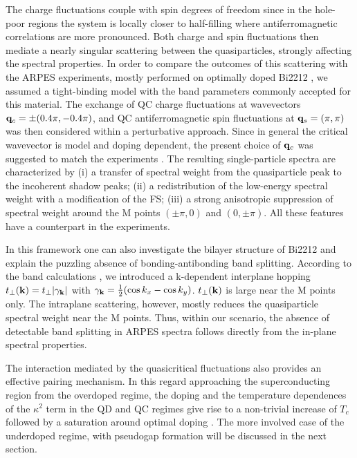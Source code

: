 \documentclass[twoside]{article}
\begin{document}
The charge fluctuations couple with spin degrees of freedom since in the 
hole-poor regions the system is locally closer to half-filling where
antiferromagnetic correlations are more pronounced.  Both charge and spin 
fluctuations then mediate a nearly singular scattering between the
quasiparticles, strongly affecting the spectral properties. In order to 
compare the outcomes of this scattering with the ARPES experiments, mostly 
performed on optimally doped Bi2212 \cite{SAINI}, we assumed \cite{CAPRARA} a 
tight-binding model with the band parameters commonly accepted for this 
material. 
The exchange of QC charge fluctuations at wavevectors ${\bf q}_c=\pm 
(0.4\pi,-0.4\pi)$, and QC antiferromagnetic spin fluctuations at  ${\bf q}_s=
(\pi,\pi)$  was then considered within a perturbative approach. Since in 
general the critical wavevector is model 
and doping dependent, the present choice of ${\bf q}_c$ was suggested
to match the experiments \cite{SAINI}. 
The resulting single-particle spectra are 
characterized by (i) a transfer of spectral weight from the quasiparticle 
peak to the incoherent shadow peaks; (ii) a redistribution of the
low-energy spectral weight with a modification of the FS; (iii) a strong 
anisotropic suppression of spectral weight around the M points
$(\pm\pi,0)$ and $(0,\pm\pi)$. All these 
features have a counterpart in the experiments. 

In this framework one can also investigate the bilayer structure of Bi2212 
and explain the puzzling absence of bonding-antibonding band
splitting. According to the band calculations \cite{andersen},
we introduced \cite{CAPRARA2} a k-dependent interplane hopping 
$t_\perp({\bf k})=t_\perp |\gamma_{\bf k}|$
with $\gamma_{\bf k}={1\over 2}(\cos k_x -\cos k_y )$. 
$t_\perp({\bf k})$ is large near the M points only. The intraplane scattering, 
however, mostly reduces the quasiparticle spectral weight near the M points.
Thus, within our scenario, the absence of detectable band splitting in ARPES 
spectra follows directly from the in-plane spectral properties.

The interaction mediated by the quasicritical fluctuations also provides an 
effective pairing mechanism. In this 
regard approaching the superconducting region from the overdoped regime, the 
doping and the temperature dependences of the $\kappa^2$ term in the QD and QC 
regimes give rise to a non-trivial increase of $T_c$ followed by a 
saturation around optimal doping \cite{prb96}. The more involved case of the 
underdoped regime, with pseudogap formation will be discussed in the next 
section.
\end{document}
